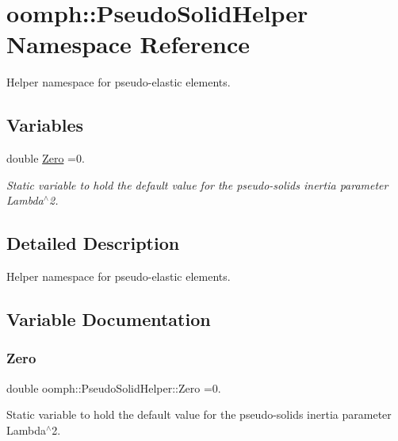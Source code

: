 \hypertarget{namespaceoomph_1_1PseudoSolidHelper}{}\section{oomph\+:\+:Pseudo\+Solid\+Helper Namespace Reference}
\label{namespaceoomph_1_1PseudoSolidHelper}


Helper namespace for pseudo-\/elastic elements.  


\subsection*{Variables}
\begin{DoxyCompactItemize}
\item 
double \hyperlink{namespaceoomph_1_1PseudoSolidHelper_a4d6244e865fddd406dc8589beb58a654}{Zero} =0.
\begin{DoxyCompactList}\small\item\em Static variable to hold the default value for the pseudo-\/solid\textquotesingle{}s inertia parameter Lambda$^\wedge$2. \end{DoxyCompactList}\end{DoxyCompactItemize}


\subsection{Detailed Description}
Helper namespace for pseudo-\/elastic elements. 

\subsection{Variable Documentation}
\mbox{\label{namespaceoomph_1_1PseudoSolidHelper_a4d6244e865fddd406dc8589beb58a654}} 
\subsubsection{\texorpdfstring{Zero}{Zero}}
{\footnotesize\ttfamily double oomph\+::\+Pseudo\+Solid\+Helper\+::\+Zero =0.}



Static variable to hold the default value for the pseudo-\/solid\textquotesingle{}s inertia parameter Lambda$^\wedge$2. 



